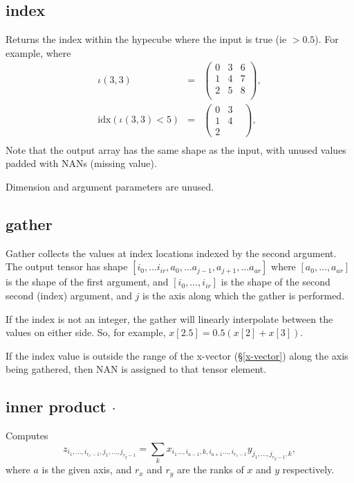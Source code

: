 \subsection{index}\label{Operation:index}

Returns the index within the hypecube where the input is true (ie
$>0.5$). For example, where
\begin{eqnarray*}
  \iota(3,3) &=& \left(\begin{array}{ccc}
  0 & 3 & 6 \\
  1 & 4 & 7 \\
  2 & 5 & 8 \\
  \end{array}\right),\\
  \mathrm{idx}(\iota(3,3)<5) &=&
  \left(\begin{array}{ccc}
    0 & 3 &\\
    1 & 4 &\\
    2 & &
  \end{array}\right),\\
\end{eqnarray*}
Note that the output array has the same shape as the input, with
unused values padded with NANs (missing value).

Dimension and argument parameters are unused.


\subsection{gather}\label{Operation:gather}

Gather collects the values at index locations indexed by the second
argument. The output tensor has shape $[i_0, \ldots i_{ir}, a_0,\ldots
a_{j-1},a_{j+1},\ldots a_{ar}]$ where $[a_0,\ldots,a_{ar}]$ is the
shape of the first argument, and $[i_0,\ldots,i_{ir}]$ is the shape of
the second second (index) argument, and $j$ is the axis along which
the gather is performed.

If the index is not an integer, the gather will linearly interpolate between
the values on either side. So, for example, $x[2.5] = 0.5 (x[2]+x[3])$.

If the index value is outside the range of the x-vector (\S\ref{x-vector}) along the axis
being gathered, then NAN is assigned to that tensor element.

\subsection{inner product $\cdot$}\label{Operation:innerProduct}
Computes
\begin{displaymath}
z_{i_1,\ldots,i_{r_x-1},j_1,\ldots,j_{r_y-1}} =
\sum_k x_{i_1\ldots,i_{a-1},k,i_{a+1}\ldots,i_{r_x-1}}
y_{j_1,\ldots,j_{r_y-1},k},
\end{displaymath}
where $a$ is the given axis, and $r_x$ and $r_y$ are the ranks of $x$ and $y$ respectively.

